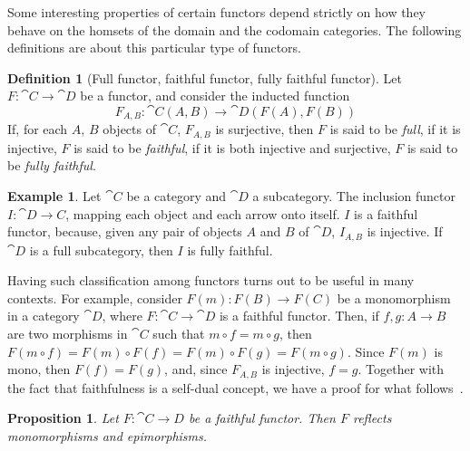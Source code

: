 \documentclass[a4paper, twoside,openright]{report}
\theoremstyle{plain}
\newtheorem{prop}[theorem]{Proposition}
\theoremstyle{definition}
\newtheorem{definition}[theorem]{Definition}
\newtheorem{example}[theorem]{Example}
\newtheorem{obs}[theorem]{Observation}
\begin{document}
Some interesting properties of certain functors depend strictly on how they behave on the homsets of the domain and the codomain categories. The following definitions are about this particular type of functors.

\begin{definition}[Full functor, faithful functor, fully faithful functor]
    Let $F: \cat C \rightarrow \cat D$ be a functor, and consider the inducted function
    $$
        F_{A, B} : {\cat C}(A, B) \rightarrow {\cat D}(F(A), F(B))
    $$
    If, for each $A$, $B$ objects of $\cat C$, $F_{A, B}$ is surjective, then $F$ is said to be \emph{full}, if it is injective, $F$ is said to be \emph{faithful}, if it is both injective and surjective, $F$ is said to be \emph{fully faithful}.
\end{definition}

\color{black}
    

\begin{example}\label{ex:full_subc_inc_fully_faith}
    Let $\cat C$ be a category and $\cat D$ a subcategory. The inclusion functor $I: \cat{D \rightarrow C}$, mapping each object and each arrow onto itself. $I$ is a faithful functor, because, given any pair of objects $A$ and $B$ of $\cat D$, $I_{A, B}$ is injective. If $\cat D$ is a full subcategory, then $I$ is fully faithful.
\end{example}

Having such classification among functors turns out to be useful in many contexts. For example, consider $F(m): F(B) \rightarrow F(C)$ be a monomorphism in a category $\cat D$, where $F: \cat C \rightarrow \cat D$ is a faithful functor. Then, if $f, g: A \rightarrow B$ are two morphisms in $\cat C$ such that $m \circ f = m \circ g$, then $F(m \circ f) = F(m) \circ F(f) = F(m) \circ F(g) = F(m\circ g)$. Since $F(m)$ is mono, then $F(f) = F(g)$, and, since $F_{A, B}$ is injective, $f = g$. Together with the fact that faithfulness is a self-dual concept, we have a proof for what follows~\cite{Herrlich_Strecker_1979}.

\begin{prop}
    Let $F: \cat{C \rightarrow D}$ be a faithful functor. Then $F$ reflects monomorphisms and epimorphisms.
\end{prop}
\end{document}
